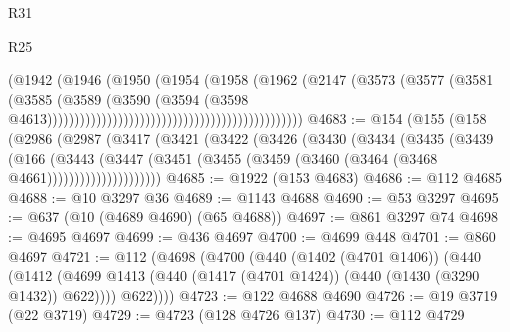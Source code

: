 \begin{lexlean}{R31}
\begin{lexlean}{R25}
\begin{coremodule}
{{{{{{{{{{{{{{{{{{{{{{{{{{{{{{{{{{{{{{{{{{{{{{{{{{{{{{{{{{{{{{{{{{{{{{{{{{{{{{{{{{{{{{{{{{{{{{{{{{{{{{{{{{{{{{{{{{{{{{{{{{{{{{{{{{{{{{{{{{{{{{{{{{{{{{{{{{{{{{{{{{{{{{{{{{{{{{{{{{{{{{{{{{{{{{{{{{{{{{{                                                                    (@1942
                                                                      (@1946
                                                                        (@1950
                                                                          (@1954
                                                                            (@1958
                                                                              (@1962
                                                                                (@2147
                                                                                  (@3573
                                                                                    (@3577
                                                                                      (@3581
                                                                                        (@3585
                                                                                          (@3589
                                                                                            (@3590
                                                                                              (@3594
                                                                                                (@3598
                                                                                                  @4613)))))))))))))))))))))))))))))))))))))))))))))))
@4683 := @154
    (@155
      (@158
        (@2986
          (@2987
            (@3417
              (@3421
                (@3422
                  (@3426
                    (@3430
                      (@3434
                        (@3435
                          (@3439
                            (@166
                              (@3443
                                (@3447
                                  (@3451
                                    (@3455 (@3459 (@3460 (@3464 (@3468 @4661)))))))))))))))))))))
@4685 := @1922 (@153 @4683)
@4686 := @112 @4685
@4688 := @10 @3297 @36
@4689 := @1143 @4688
@4690 := @53 @3297
@4695 := @637 (@10 (@4689 @4690) (@65 @4688))
@4697 := @861 @3297 @74
@4698 := @4695 @4697
@4699 := @436 @4697
@4700 := @4699 @448
@4701 := @860 @4697
@4721 := @112
    (@4698
      (@4700
        (@440
          (@1402 (@4701 @1406))
          (@440
            (@1412 (@4699 @1413 (@440 (@1417 (@4701 @1424)) (@440 (@1430 (@3290 @1432)) @622))))
            @622))))
@4723 := @122 @4688 @4690
@4726 := @19 @3719 (@22 @3719)
@4729 := @4723 (@128 @4726 @137)
@4730 := @112 @4729
}}}}}}}}}}}}}}}}}}}}}}}}}}}}}}}}}}}}}}}}}}}}}}}}}}}}}}}}}}}}}}}}}}}}}}}}}}}}}}}}}}}}}}}}}}}}}}}}}}}}}}}}}}}}}}}}}}}}}}}}}}}}}}}}}}}}}}}}}}}}}}}}}}}}}}}}}}}}}}}}}}}}}}}}}}}}}}}}}}}}}}}}}}}}}}}}}}}}}}}
\end{coremodule}
\end{lexlean}
\end{lexlean}
